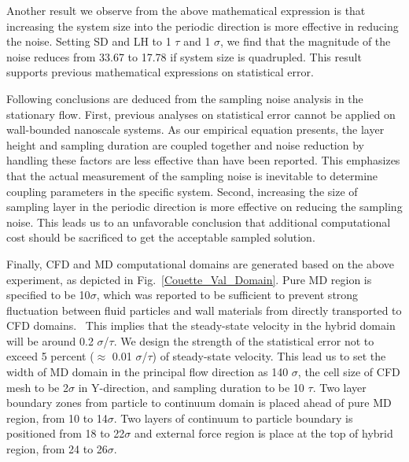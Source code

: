 \documentclass[preprint,12pt]{elsarticle}
\begin{document}
Another result we observe from the above mathematical expression is that increasing the system size into the periodic direction is more effective in reducing the noise. Setting SD and LH to 1 $\tau$ and 1 $\sigma$, we find that the magnitude of the noise reduces from 33.67 to 17.78 if system size is quadrupled. This result supports previous mathematical expressions on statistical error.




Following conclusions are deduced from the sampling noise analysis in the stationary flow. First, previous analyses on statistical error cannot be applied on wall-bounded nanoscale systems. As our empirical equation presents, the layer height and sampling duration are coupled together and noise reduction by handling these factors are less effective than have been reported. This emphasizes that the actual measurement of the sampling noise is inevitable to determine coupling parameters in the specific system.
Second, increasing the size of sampling layer in the periodic direction is more effective on reducing the sampling noise. This leads us to an unfavorable conclusion that additional computational cost should be sacrificed to get the acceptable sampled solution.


Finally, CFD and MD computational domains are generated based on the above experiment, as depicted in Fig.~\ref{Couette_Val_Domain}. Pure MD region is specified to be 10$\sigma$, which was reported to be sufficient to prevent strong fluctuation between fluid particles and wall materials from directly transported to CFD domains.~\cite{Yen} This implies that the steady-state velocity in the hybrid domain will be around 0.2 $\sigma$/$\tau$. We design the strength of the statistical error not to exceed 5 percent ($\approx$ 0.01 $\sigma$/$\tau$) of steady-state velocity. This lead us to set the width of MD domain in the principal flow direction as 140 $\sigma$, the cell size of CFD mesh to be 2$\sigma$ in Y-direction, and sampling duration to be 10 $\tau$. Two layer boundary zones from particle to continuum domain is placed ahead of pure MD region, from 10 to 14$\sigma$. Two layers of continuum to particle boundary is positioned from 18 to 22$\sigma$ and external force region is place at the top of hybrid region, from 24 to 26$\sigma$.
\end{document}
